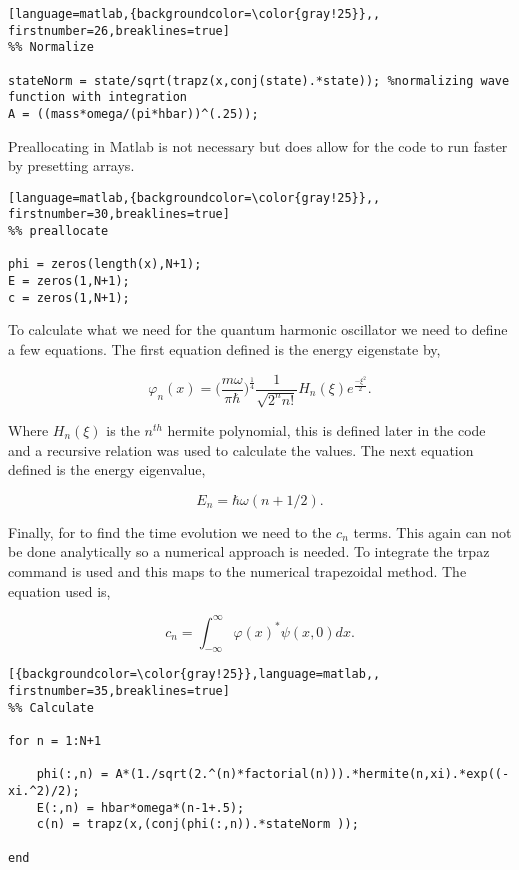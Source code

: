 \documentclass{article}
\begin{document}
\begin{lstlisting}[language=matlab,{backgroundcolor=\color{gray!25}},, firstnumber=26,breaklines=true]
%% Normalize

stateNorm = state/sqrt(trapz(x,conj(state).*state)); %normalizing wave function with integration
A = ((mass*omega/(pi*hbar))^(.25));

\end{lstlisting}

Preallocating in Matlab is not necessary but does allow for the code to run faster by presetting arrays. 

\begin{lstlisting}[language=matlab,{backgroundcolor=\color{gray!25}},, firstnumber=30,breaklines=true]
%% preallocate 

phi = zeros(length(x),N+1);
E = zeros(1,N+1);
c = zeros(1,N+1);
\end{lstlisting}

To calculate what we need for the quantum harmonic oscillator we need to define a few equations. The first equation defined is the energy eigenstate by,

$$
\varphi_{n}(x) = \Bigg(\frac{m\omega}{\pi \hbar}\Bigg)^{\frac{1}{4}}\frac{1}{\sqrt{2^{n}n!}}H_{n}(\xi)e^{\frac{-\xi^{2}}{2}}.
$$

Where $H_{n}(\xi)$ is the $n^{th}$ hermite polynomial, this is defined later in the code and a recursive relation was used to calculate the values. The next equation defined is the energy eigenvalue,

$$
E_{n} = \hbar \omega(n+1/2).
$$

Finally, for to find the time evolution we need to the $c_{n}$ terms. This again can not be done analytically so a numerical approach is needed. To integrate the trpaz command is used and this maps to the numerical trapezoidal method. The equation used is,

$$
c_{n} = \int_{-\infty}^{\infty} \varphi(x)^{*}\psi(x,0) dx.
$$

\begin{lstlisting}[{backgroundcolor=\color{gray!25}},language=matlab,, firstnumber=35,breaklines=true]
%% Calculate

for n = 1:N+1
    
    phi(:,n) = A*(1./sqrt(2.^(n)*factorial(n))).*hermite(n,xi).*exp((-xi.^2)/2);
    E(:,n) = hbar*omega*(n-1+.5);
    c(n) = trapz(x,(conj(phi(:,n)).*stateNorm ));

end
\end{lstlisting}
\end{document}
